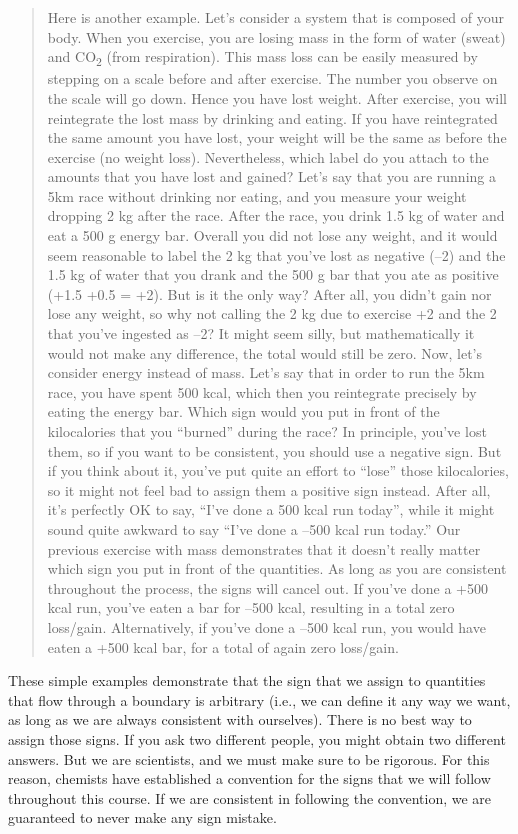 \documentclass[
]{book}
\theoremstyle{definition}
\theoremstyle{definition}
\theoremstyle{definition}
\theoremstyle{remark}
\begin{document}
\begin{quote}
Here is another example. Let's consider a system that is composed of your body. When you exercise, you are losing mass in the form of water (sweat) and CO\textsubscript{2} (from respiration). This mass loss can be easily measured by stepping on a scale before and after exercise. The number you observe on the scale will go down. Hence you have lost weight. After exercise, you will reintegrate the lost mass by drinking and eating. If you have reintegrated the same amount you have lost, your weight will be the same as before the exercise (no weight loss). Nevertheless, which label do you attach to the amounts that you have lost and gained? Let's say that you are running a 5km race without drinking nor eating, and you measure your weight dropping 2 kg after the race. After the race, you drink 1.5 kg of water and eat a 500 g energy bar. Overall you did not lose any weight, and it would seem reasonable to label the 2 kg that you've lost as negative (--2) and the 1.5 kg of water that you drank and the 500 g bar that you ate as positive (+1.5 +0.5 = +2). But is it the only way? After all, you didn't gain nor lose any weight, so why not calling the 2 kg due to exercise +2 and the 2 that you've ingested as --2? It might seem silly, but mathematically it would not make any difference, the total would still be zero. Now, let's consider energy instead of mass. Let's say that in order to run the 5km race, you have spent 500 kcal, which then you reintegrate precisely by eating the energy bar. Which sign would you put in front of the kilocalories that you ``burned'' during the race? In principle, you've lost them, so if you want to be consistent, you should use a negative sign. But if you think about it, you've put quite an effort to ``lose'' those kilocalories, so it might not feel bad to assign them a positive sign instead. After all, it's perfectly OK to say, ``I've done a 500 kcal run today'', while it might sound quite awkward to say ``I've done a --500 kcal run today.'' Our previous exercise with mass demonstrates that it doesn't really matter which sign you put in front of the quantities. As long as you are consistent throughout the process, the signs will cancel out. If you've done a +500 kcal run, you've eaten a bar for --500 kcal, resulting in a total zero loss/gain. Alternatively, if you've done a --500 kcal run, you would have eaten a +500 kcal bar, for a total of again zero loss/gain.
\end{quote}

These simple examples demonstrate that the sign that we assign to quantities that flow through a boundary is arbitrary (i.e., we can define it any way we want, as long as we are always consistent with ourselves). There is no best way to assign those signs. If you ask two different people, you might obtain two different answers. But we are scientists, and we must make sure to be rigorous. For this reason, chemists have established a convention for the signs that we will follow throughout this course. If we are consistent in following the convention, we are guaranteed to never make any sign mistake.
\end{document}
